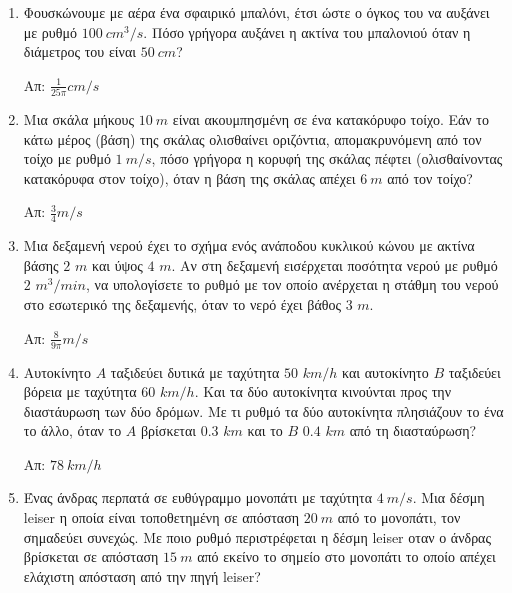 







\pagestyle{askhseis}

\begin{center}
  \minibox{\large \bfseries \textcolor{Col1}{Προβλήματα στο ρυθμό μεταβολής}}
\end{center}

\vspace{\baselineskip}

\begin{enumerate}

	\item  Φουσκώνουμε με αέρα ένα σφαιρικό μπαλόνι, έτσι
		ώστε ο όγκος του να αυξάνει με ρυθμό $\SI{100}{cm^{3}\per s}$. Πόσο γρήγορα
		αυξάνει η ακτίνα του μπαλονιού όταν η διάμετρος του είναι $\SI{50}{cm}$?

		\hfill Απ: $\frac{1}{25\pi}\si{cm\per s}$


	\item  Μια σκάλα μήκους $\SI{10}{m}$ είναι ακουμπησμένη
		σε ένα κατακόρυφο τοίχο. Εάν το κάτω μέρος (βάση) της σκάλας ολισθαίνει
		οριζόντια, απομακρυνόμενη από τον τοίχο με ρυθμό $\SI{1}{m\per s}$, πόσο
		γρήγορα η κορυφή της σκάλας πέφτει (ολισθαίνοντας κατακόρυφα στον τοίχο), όταν η
		βάση της σκάλας απέχει $\SI{6}{m}$ από τον τοίχο?

		\hfill Απ: $\frac{3}{4}\si{m\per s}$

	\item  Μια δεξαμενή νερού έχει το σχήμα ενός ανάποδου
		κυκλικού κώνου με ακτίνα βάσης $2$ $\si{m}$ και ύψος $4$ $\si{m}$. Αν
		στη δεξαμενή εισέρχεται ποσότητα νερού με ρυθμό $2$ $\si{m^{3}/min}$, να
		υπολογίσετε το ρυθμό με τον οποίο ανέρχεται η στάθμη του νερού στο εσωτερικό της
		δεξαμενής, όταν το νερό έχει βάθος $3$ $\si{m}$.

		\hfill Απ: $\frac{8}{9\pi}\si{m\per s}$

	\item   Αυτοκίνητο $A$ ταξιδεύει δυτικά με ταχύτητα $50$
		$\si{km\per h}$ και αυτοκίνητο $B$ ταξιδεύει βόρεια με ταχύτητα $60$
		$\si{km/h}$. Και τα δύο αυτοκίνητα κινούνται προς την διαστάυρωση των δύο δρόμων. Με τι ρυθμό τα δύο αυτοκίνητα πλησιάζουν το ένα το άλλο, όταν το $A$ βρίσκεται $0.3$ $\si{km}$ και το $B$ $0.4$ $\si{km}$ από τη διασταύρωση?

		\hfill Απ: $\SI{78}{km/h}$

	\item  Ένας άνδρας περπατά σε ευθύγραμμο μονοπάτι με
		ταχύτητα $\SI{4}{m/s}$. Μια δέσμη leiser η οποία είναι τοποθετημένη σε απόσταση $\SI{20}{m}$ από το μονοπάτι, τον σημαδεύει συνεχώς. Με ποιο ρυθμό περιστρέφεται η δέσμη leiser οταν ο άνδρας βρίσκεται σε απόσταση $\SI{15}{m}$ από εκείνο το σημείο στο μονοπάτι το οποίο απέχει ελάχιστη απόσταση από την πηγή leiser?


\end{enumerate}
